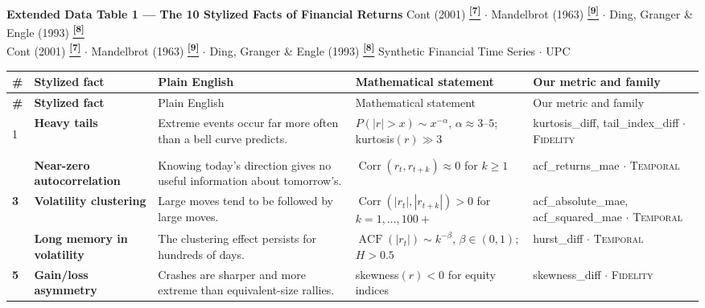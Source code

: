 \documentclass[10pt]{article}
\newcommand{\pagehead}[2]{%
  \begin{tcolorbox}[enhanced,arc=0pt,outer arc=0pt,boxrule=0pt,
    colback=Navy,colframe=Navy,
    top=5pt,bottom=5pt,left=8pt,right=8pt,
    before skip=0pt,after skip=10pt]
  {\color{white}\large\bfseries #1}%
  \ifx\relax#2\relax\else\\[1pt]{\color{blue!30!white}\small #2}\fi
  \hfill{\color{blue!20!white}\footnotesize Synthetic Financial Time Series $\cdot$ UPC}
  \end{tcolorbox}}
\newcommand{\tcite}[1]{%
  \hyperlink{R:#1}{\textsuperscript{\scriptsize\textbf{[#1]}}}}
\begin{document}
\pagehead{Extended Data Table 1 --- The 10 Stylized Facts of Financial Returns}
         {Cont (2001)\tcite{7} $\cdot$ Mandelbrot (1963)\tcite{9} $\cdot$ Ding, Granger \& Engle (1993)\tcite{8}}

\vspace{2pt}
\small
\setlength{\tabcolsep}{5pt}
\renewcommand{\arraystretch}{1.4}
\begin{longtable}{%
  >{\bfseries\centering}p{}
  >{\bfseries}p{}
  p{}
  p{}
  p{}}

\rowcolor{Navy}
{\color{white}\#} &
{\color{white}Stylized fact} &
{\color{white}Plain English} &
{\color{white}Mathematical statement} &
{\color{white}Our metric and family} \\[2pt]
\endfirsthead
\rowcolor{Navy}
{\color{white}\#} &
{\color{white}Stylized fact} &
{\color{white}Plain English} &
{\color{white}Mathematical statement} &
{\color{white}Our metric and family} \\[2pt]
\endhead

\rowcolor{TabOdd}
1 & Heavy tails &
  Extreme events occur far more often than a bell curve predicts. &
  $P(|r|>x) \sim x^{-\alpha}$, $\alpha \approx 3$--$5$; kurtosis$(r) \gg 3$ &
  kurtosis\_diff, tail\_index\_diff $\cdot$ \textsc{Fidelity} \\

2 & Near-zero autocorrelation &
  Knowing today's direction gives no useful information about tomorrow's. &
  $\operatorname{Corr}(r_t, r_{t+k}) \approx 0$ for $k \geq 1$ &
  acf\_returns\_mae $\cdot$ \textsc{Temporal} \\

\rowcolor{TabOdd}
3 & Volatility clustering &
  Large moves tend to be followed by large moves. &
  $\operatorname{Corr}(|r_t|, |r_{t+k}|) > 0$ for $k = 1, \ldots, 100{+}$ &
  acf\_absolute\_mae, acf\_squared\_mae $\cdot$ \textsc{Temporal} \\

4 & Long memory in volatility &
  The clustering effect persists for hundreds of days. &
  $\operatorname{ACF}(|r_t|) \sim k^{-\beta}$, $\beta \in (0,1)$; $H > 0.5$ &
  hurst\_diff $\cdot$ \textsc{Temporal} \\

\rowcolor{TabOdd}
5 & Gain/loss asymmetry &
  Crashes are sharper and more extreme than equivalent-size rallies. &
  skewness$(r) < 0$ for equity indices &
  skewness\_diff $\cdot$ \textsc{Fidelity} \\


\end{longtable}
\end{document}

